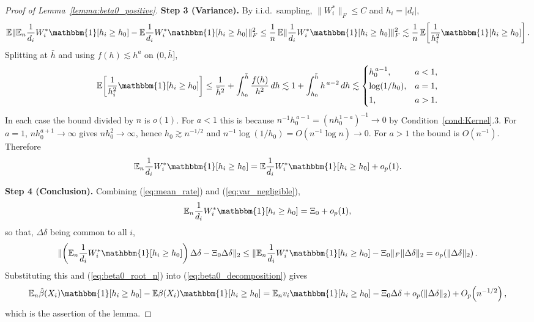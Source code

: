 \documentclass{article}
\newcommand{\normm}[1]{\lVert#1\rVert}
\newcommand{\E}{\mathbb{E}}
\newcommand{\I}{\mathbbm{1}}
\begin{document}
\begin{appendices}
\begin{proof}[Proof of Lemma~\ref{lemma:beta0_positive}]
\textbf{Step 3 (Variance).}
By i.i.d.\ sampling, $\normm{W_i^{*}}_F\le C$ and $h_i=|d_i|$,
\begin{align*}
    \E\normm{\E_n \frac{1}{d_i}W_i^{*}\I[h_i\ge h_0]
      -\E \frac{1}{d_i}W_i^{*}\I[h_i\ge h_0]}_F^2
    \le \frac{1}{n}\,\E\normm{\frac{1}{d_i}W_i^{*}\I[h_i\ge h_0]}_F^2
    \lesssim \frac{1}{n}\,\E\!\left[\frac{1}{h_i^{2}}\I[h_i\ge h_0]\right].
\end{align*}
Splitting at $\bar h$ and using $f(h)\lesssim h^{a}$ on $(0,\bar h]$,
\begin{align*}
    \E\!\left[\frac{1}{h_i^{2}}\I[h_i\ge h_0]\right]
    \le \frac{1}{\bar h^{2}} + \int_{h_0}^{\bar h}\frac{f(h)}{h^{2}}\,dh
    \lesssim 1 + \int_{h_0}^{\bar h}h^{\,a-2}\,dh
    \lesssim
    \begin{cases}
        h_0^{\,a-1}, & a<1,\\[2pt]
        \log(1/h_0), & a=1,\\[2pt]
        1, & a>1 .
    \end{cases}
\end{align*}
In each case the bound divided by $n$ is $o(1)$. For $a<1$ this is because
$n^{-1}h_0^{\,a-1}=(nh_0^{1-a})^{-1}\to0$ by
Condition~\ref{cond:Kernel}.3. For $a=1$, $nh_0^{a+1}\to\infty$ gives
$nh_0^{2}\to\infty$, hence $h_0\gtrsim n^{-1/2}$ and
$n^{-1}\log(1/h_0)=O(n^{-1}\log n)\to0$. For $a>1$ the bound is $O(n^{-1})$.
Therefore
\begin{align}\label{eq:var_negligible}
    \E_n \frac{1}{d_i}W_i^{*}\I[h_i\ge h_0]
    = \E \frac{1}{d_i}W_i^{*}\I[h_i\ge h_0] + o_p(1).
\end{align}

\textbf{Step 4 (Conclusion).}
Combining (\ref{eq:mean_rate}) and (\ref{eq:var_negligible}),
\begin{align*}
    \E_n \frac{1}{d_i}W_i^{*}\I[h_i\ge h_0] = \Xi_0 + o_p(1),
\end{align*}
so that, $\Delta\delta$ being common to all $i$,
\begin{align*}
    \normm{\left(\E_n \frac{1}{d_i}W_i^{*}\I[h_i\ge h_0]\right)\Delta\delta
    -\Xi_0\Delta\delta}_2
    \le \normm{\E_n \frac{1}{d_i}W_i^{*}\I[h_i\ge h_0]-\Xi_0}_F
        \normm{\Delta\delta}_2
    = o_p\!\left(\normm{\Delta\delta}_2\right).
\end{align*}
Substituting this and (\ref{eq:beta0_root_n}) into
(\ref{eq:beta0_decomposition}) gives
\begin{align*}
    \E_n \hat{\beta}(X_i)\I[h_i\geq h_0] - \E \beta(X_i)\I[h_i\geq h_0]
    = \E_n v_i\I[h_i\geq h_0] - \Xi_0\Delta\delta
      + o_p\!\left(\normm{\Delta\delta}_2\right) + O_p\!\left(n^{-1/2}\right),
\end{align*}
which is the assertion of the lemma.


\end{proof}
\end{appendices}
\end{document}
